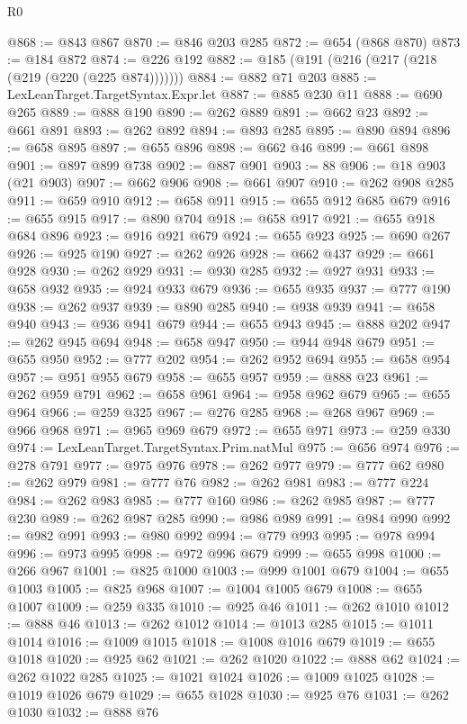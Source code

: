 \begin{lexlean}{R0}
\begin{coremodule}
@868 := @843 @867
@870 := @846 @203 @285
@872 := @654 (@868 @870)
@873 := @184 @872
@874 := @226 @192
@882 := @185 (@191 (@216 (@217 (@218 (@219 (@220 (@225 @874)))))))
@884 := @882 @71 @203
@885 := LexLeanTarget.TargetSyntax.Expr.let
@887 := @885 @230 @11
@888 := @690 @265
@889 := @888 @190
@890 := @262 @889
@891 := @662 @23
@892 := @661 @891
@893 := @262 @892
@894 := @893 @285
@895 := @890 @894
@896 := @658 @895
@897 := @655 @896
@898 := @662 @46
@899 := @661 @898
@901 := @897 @899 @738
@902 := @887 @901
@903 := 88
@906 := @18 @903 (@21 @903)
@907 := @662 @906
@908 := @661 @907
@910 := @262 @908 @285
@911 := @659 @910
@912 := @658 @911
@915 := @655 @912 @685 @679
@916 := @655 @915
@917 := @890 @704
@918 := @658 @917
@921 := @655 @918 @684 @896
@923 := @916 @921 @679
@924 := @655 @923
@925 := @690 @267
@926 := @925 @190
@927 := @262 @926
@928 := @662 @437
@929 := @661 @928
@930 := @262 @929
@931 := @930 @285
@932 := @927 @931
@933 := @658 @932
@935 := @924 @933 @679
@936 := @655 @935
@937 := @777 @190
@938 := @262 @937
@939 := @890 @285
@940 := @938 @939
@941 := @658 @940
@943 := @936 @941 @679
@944 := @655 @943
@945 := @888 @202
@947 := @262 @945 @694
@948 := @658 @947
@950 := @944 @948 @679
@951 := @655 @950
@952 := @777 @202
@954 := @262 @952 @694
@955 := @658 @954
@957 := @951 @955 @679
@958 := @655 @957
@959 := @888 @23
@961 := @262 @959 @791
@962 := @658 @961
@964 := @958 @962 @679
@965 := @655 @964
@966 := @259 @325
@967 := @276 @285
@968 := @268 @967
@969 := @966 @968
@971 := @965 @969 @679
@972 := @655 @971
@973 := @259 @330
@974 := LexLeanTarget.TargetSyntax.Prim.natMul
@975 := @656 @974
@976 := @278 @791
@977 := @975 @976
@978 := @262 @977
@979 := @777 @62
@980 := @262 @979
@981 := @777 @76
@982 := @262 @981
@983 := @777 @224
@984 := @262 @983
@985 := @777 @160
@986 := @262 @985
@987 := @777 @230
@989 := @262 @987 @285
@990 := @986 @989
@991 := @984 @990
@992 := @982 @991
@993 := @980 @992
@994 := @779 @993
@995 := @978 @994
@996 := @973 @995
@998 := @972 @996 @679
@999 := @655 @998
@1000 := @266 @967
@1001 := @825 @1000
@1003 := @999 @1001 @679
@1004 := @655 @1003
@1005 := @825 @968
@1007 := @1004 @1005 @679
@1008 := @655 @1007
@1009 := @259 @335
@1010 := @925 @46
@1011 := @262 @1010
@1012 := @888 @46
@1013 := @262 @1012
@1014 := @1013 @285
@1015 := @1011 @1014
@1016 := @1009 @1015
@1018 := @1008 @1016 @679
@1019 := @655 @1018
@1020 := @925 @62
@1021 := @262 @1020
@1022 := @888 @62
@1024 := @262 @1022 @285
@1025 := @1021 @1024
@1026 := @1009 @1025
@1028 := @1019 @1026 @679
@1029 := @655 @1028
@1030 := @925 @76
@1031 := @262 @1030
@1032 := @888 @76

\end{coremodule}
\end{lexlean}
